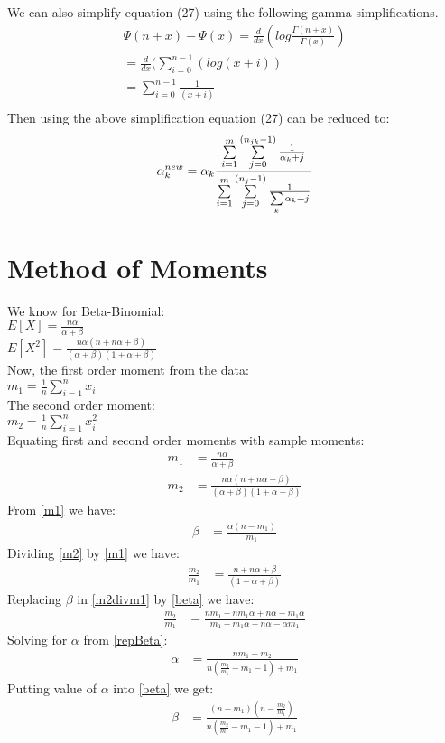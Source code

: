 \documentclass{article} %
\newcommand{\?}{\stackrel{?}{=}}
\begin{document}
We can also simplify equation (27) using the following gamma simplifications. \\
\begin{align}
\Psi(n+x)-\Psi(x) = \frac{d}{dx}(log\frac{ \Gamma(n+x)}{\Gamma(x)})\\
=\frac{d}{dx}(\sum\limits_{i=0}^{n-1}( log (x+i))\\
=\sum\limits_{i=0}^{n-1}\frac{1}{(x+i)}\\
\end{align}
Then using the above simplification equation (27) can be reduced to:
\begin{align}
\alpha_k^{new} &= \alpha_k \frac{\sum\limits_{i=1}^{m}  \sum\limits_{j=0}^{(n_{jk}-1)}\frac{1}{\alpha_k +j}}{\sum\limits_{i=1}^{m}\sum\limits\limits_{j=0}^{(n_{j}-1)}\frac{1}{\sum\limits_k \alpha_k +j}}\\
\end{align}
\section{Method of Moments} \label{MOM}
We know for Beta-Binomial:\\
$E[X] = \frac{n\alpha}{\alpha+\beta}$\\
$E[X^2] = \frac{n\alpha(n+n\alpha+\beta)}{(\alpha+\beta)(1+\alpha+\beta)}$\\
Now, the first order moment from the data:\\
$m_1=\frac{1}{n}\sum\limits_{i=1}^{n}x_i$\\
The second order moment:\\
$m_2=\frac{1}{n}\sum\limits_{i=1}^{n}x_i^2$\\
Equating first and second order moments with sample moments:
\begin{align}
m_1 &= \frac{n\alpha}{\alpha+\beta}\label{m1}\\
m_2 &= \frac{n\alpha(n+n\alpha+\beta)}{(\alpha+\beta)(1+\alpha+\beta)}\label{m2}
\end{align}
From \ref{m1} we have:
\begin{align}
\beta&=\frac{\alpha(n-m_1)}{m_1}\label{beta}
\end{align}
Dividing \ref{m2} by \ref{m1} we have:
\begin{align}
\frac{m_2}{m_1}&=\frac{n+n\alpha+\beta}{(1+\alpha+\beta)}\label{m2divm1}
\end{align}
Replacing $\beta$ in \ref{m2divm1} by \ref{beta} we have:
\begin{align}
\frac{m_2}{m_1}&=\frac{nm_1+nm_1\alpha+n\alpha-m_1\alpha}{m_1+m_1\alpha+n\alpha-\alpha m_1}\label{repBeta}
\end{align}
Solving for $\alpha$ from \ref{repBeta}:
\begin{align}
\alpha&=\frac{nm_1-m_2}{n(\frac{m_2}{m_1}-m_1-1)+m_1}
\end{align}
Putting value of $\alpha$ into \ref{beta} we get:
\begin{align}
\beta &= \frac{(n-m_1)(n-\frac{m_2}{m_1})}{n(\frac{m_2}{m_1}-m_1-1)+m_1}
\end{align}
\end{document}
